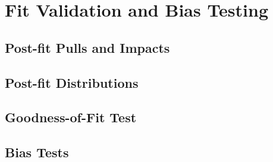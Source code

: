 
\section{Fit Validation and Bias Testing}
\label{sec:bias}

\subsection{Post-fit Pulls and Impacts}

\subsection{Post-fit Distributions}

\subsection{Goodness-of-Fit Test}

\subsection{Bias Tests}
